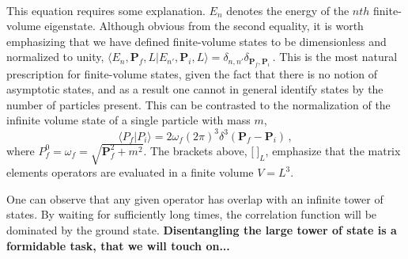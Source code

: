 \documentclass{iopart}
\newcommand{\raul}[0]{\bf \color{blue} }
\theoremstyle{definition}
\begin{document}
{\begin{eqnarray}
\label{eq:completeset}
\end{eqnarray}
This equation requires some explanation. $E_{n}$ denotes the energy of the $nth$ finite-volume eigenstate. Although obvious from the second equality, it is worth emphasizing that we have defined finite-volume states to be dimensionless and normalized to unity, $\langle E_n, \mathbf P_f, L \vert E_{n'}, \mathbf P_i, L \rangle = \delta_{n,n'}\delta_{\mathbf P_f, \mathbf P_i} \,$. This is the most natural prescription for finite-volume states, given the fact that there is no notion of asymptotic states, and as a result one cannot in general identify states by the number of particles present. This can be contrasted to the normalization of the infinite volume state of a single particle with mass $m$,
\begin{equation}
\langle  P_f  \vert   P_i \rangle = 2 \omega_{f} (2 \pi)^3 \delta^3(\mathbf P_f- \mathbf P_i) \,,
\end{equation}
where $ P_f^0= \omega_{f} = \sqrt{\mathbf P_f ^2 + m^2}$. The brackets above, $\Big [  ~\Big ]_L$, emphasize that the matrix elements operators are evaluated in a finite volume $V=L^3$. 

One can observe that any given operator has overlap with an infinite tower of states. By waiting for sufficiently long times, the correlation function will be dominated by the ground state. {\raul Disentangling the large tower of state is a formidable task, that we will touch on...} 

}
\end{document}
